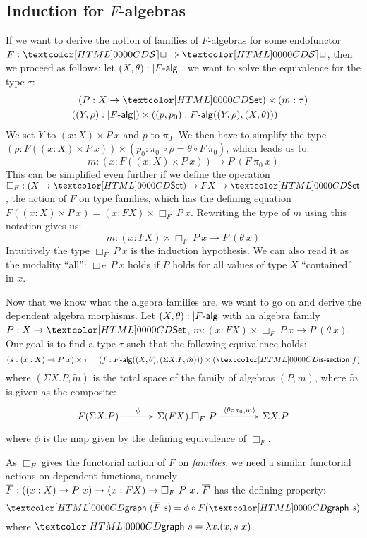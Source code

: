 \subsection{Induction for $F$-algebras}
\label{induction-for-f-algebras}
If we want to derive the notion of families of $F$-algebras for some
endofunctor $F : \Func{\SET}{\SET}$, then we proceed as follows: let
$(X,\theta) : | \algcat{F} |$, we want to solve the equivalence for
the type $\tau$:
%
\begin{align*}
&\ \ \ \ \ \ (P : X \to \Set) \times (m : \tau) \\
&= ((Y,\rho) : | \algcat{F} |) \times ((p,p_0) : \algcat{F}((Y,\rho),(X,\theta)))  
\end{align*}
%
We set $Y$ to $(x : X) \times P\ x$ and $p$ to $\pi_0$. We then have
to simplify the type
$(\rho : F ((x : X) \times P\ x)) \times (p_0 : \pi_0\ \circ \rho =
\theta \circ F\ \pi_0)$, which leads us to:
$$
m : (x : F ((x : X) \times P\ x)) \to P\ (F\ \pi_0\ x)
$$
This can be simplified even further if we define the operation
$\Box_F : (X \to \Set) \to FX \to \Set$, \ie the action of $F$ on type
families, which has the defining equation
$F ((x : X) \times P\ x) = (x : FX) \times \Box_F\ P\
x$. Rewriting the type of $m$ using this notation gives us:
$$
m : (x : FX) \times \Box_F\ P\ x \to P\ (\theta\ x)
$$
Intuitively the type $\Box_F\ P\ x$ is the induction hypothesis. We
can also read it as the modality ``all'': $\Box_F\ P\ x$ holds if $P$
holds for all values of type $X$ ``contained'' in $x$.

Now that we know what the algebra families are, we want to go on and
derive the dependent algebra morphisms. Let
$(X,\theta) : | \algcat{F}$ with an algebra family $P : X \to \Set$,
$m : (x : FX) \times \Box_F\ P\ x \to P\ (\theta\ x)$. Our goal is to
find a type $\tau$ such that the following equivalence holds:
$$
(s : (x : X) \to P\ x) \times \tau = (f : \algcat{F}((X,\theta),(\Sigma X . P , \tilde{m}))) \times (\issection\ f)
$$
where $(\Sigma X . P , \tilde{m})$ is the total space of the family of
algebras $(P,m)$, where $\tilde{m}$ is given as the composite:
$$
\xymatrix@!C{
  F (\Sigma X . P)
  \ar[r]^-{\phi}
  &\Sigma (FX) . \Box_F\ P
  \ar[r]^-{\langle \theta \circ \pi_0 , m \rangle}
  &\Sigma X . P
}
$$
where $\phi$ is the map given by the defining equivalence of $\Box_F$.

As $\Box_F$ gives the functorial action of $F$ on \emph{families}, we
need a similar functorial actions on dependent functions, namely
$\overline{F} : ((x : X) \to P\ x) \to (x : FX) \to \Box_F\ P\
x$. $\overline{F}$ has the defining property:
$$
\grph\ (\liftdephom{F}\ s) = \phi \circ F (\grph\ s)
$$
where $\grph\ s = \lambda x . (x , s\ x)$.

